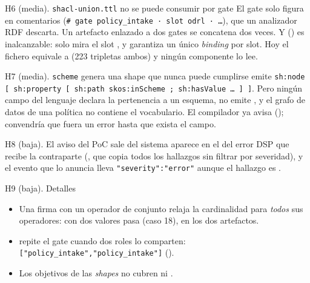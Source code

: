 \begin{hallazgo}{H6 (media). \texttt{shacl-union.ttl} no se puede consumir por gate}
El gate solo figura en comentarios (\texttt{\# gate policy\_intake · slot odrl · …}), que un analizador RDF
descarta. Un artefacto enlazado a dos gates se concatena dos veces. Y 
() es inalcanzable: solo mira el slot , y  garantiza un único
\emph{binding} por slot. Hoy el fichero equivale a  (223 tripletas ambos) y ningún componente lo
lee.
\end{hallazgo}

\begin{hallazgo}{H7 (media). \texttt{scheme} genera una shape que nunca puede cumplirse}
 emite \texttt{sh:node [ sh:property [ sh:path skos:inScheme ; sh:hasValue … ] ]}. Pero
ningún campo del lenguaje declara la pertenencia a un esquema,  no emite , y
el grafo de datos de una política no contiene el vocabulario. El compilador ya avisa
(); convendría que fuera un error hasta que exista el campo.
\end{hallazgo}

\begin{hallazgo}{H8 (baja). El aviso del PoC sale del sistema}
 aparece en el  del error DSP que recibe la contraparte
(, que copia todos los hallazgos sin filtrar por severidad), y el evento  que
lo anuncia lleva \texttt{"severity":"error"} aunque el hallazgo es .
\end{hallazgo}

\begin{hallazgo}{H9 (baja). Detalles}
\begin{itemize}[leftmargin=*, itemsep=1pt]
  \item Una firma con un operador de conjunto relaja la cardinalidad para \emph{todos} sus operadores: 
        con dos valores pasa (caso 18), en los dos artefactos.
  \item {} repite el gate cuando dos roles lo comparten:
        \texttt{["policy\_intake","policy\_intake"]} ().
  \item Los objetivos de las \emph{shapes} no cubren  ni .
\end{itemize}
\end{hallazgo}

